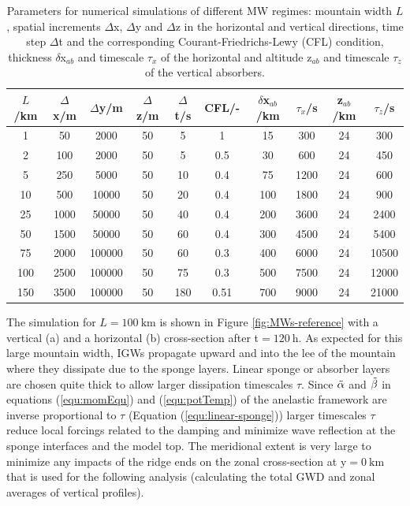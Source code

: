 \begin{table}[t]
    \centering
    \caption{Parameters for numerical simulations of different MW regimes: mountain width $L$, spatial increments $\Delta$x, $\Delta$y and $\Delta$z in the horizontal and vertical directions, time step $\Delta$t and the corresponding Courant-Friedrichs-Lewy (CFL) condition, thickness $\delta$x$_{ab}$ and timescale $\tau_x$ of the horizontal and altitude z$_{ab}$ and timescale $\tau_z$ of the vertical absorbers.}
    \begin{tabular}{@{}cccccccccc@{}}
    \toprule
    $L$/km & $\Delta$x/m & $\Delta$y/m & $\Delta$z/m & $\Delta$t/s & CFL/- & $\delta$x$_{ab}$/km & $\tau_x$/s  & z$_{ab}$/km & $\tau_z$/s \\ \midrule[1pt]
    1   & 50 & 2000 & 50 & 5 & 1 & 15  & 300  & 24 & 300   \\
    2   & 100 & 2000 & 50 & 5 & 0.5  & 30  & 600  & 24 & 450   \\
    5   & 250 & 5000 & 50 & 10 & 0.4 & 75  & 1200 & 24 & 600  \\
    10  & 500 & 10000 & 50 & 20 & 0.4  & 100 & 1800 & 24 & 900  \\
    25  & 1000 & 50000 & 50 & 40 & 0.4  & 200 & 3600 & 24 & 2400  \\
    50  & 1500 & 50000 & 50 & 60 & 0.4  & 300 & 4500 & 24 & 5400  \\
    75  & 2000 & 100000 & 50 & 60 & 0.3 & 400 & 6000 & 24 & 10500 \\
    100 & 2500 & 100000 & 50 & 75 & 0.3  & 500 & 7500 & 24 & 12000 \\
    150 & 3500 & 100000 & 50 & 180 & 0.51 & 700 & 9000 & 24 & 21000 \\
    \bottomrule
    \end{tabular}
    \label{tab:linearRegimes}
\end{table}
The simulation for $L=\SI{100}{\kilo\meter}$ is shown in Figure \ref{fig:MWs-reference} with a vertical (a) and a horizontal (b) cross-section after t$=\SI{120}{\hour}$. As expected for this large mountain width, IGWs propagate upward and into the lee of the mountain where they dissipate due to the sponge layers. Linear sponge or absorber layers are chosen quite thick to allow larger dissipation timescales $\tau$. Since $\Tilde{\alpha}$ and $\Tilde{\beta}$ in equations (\ref{equ:momEqu}) and (\ref{equ:potTemp}) of the anelastic framework are inverse proportional to $\tau$ (Equation (\ref{equ:linear-sponge})) larger timescales $\tau$ reduce local forcings related to the damping and minimize wave reflection at the sponge interfaces and the model top. The meridional extent is very large to minimize any impacts of the ridge ends on the zonal cross-section at y$=\SI{0}{\kilo\meter}$ that is used for the following analysis (calculating the total GWD and zonal averages of vertical profiles).
